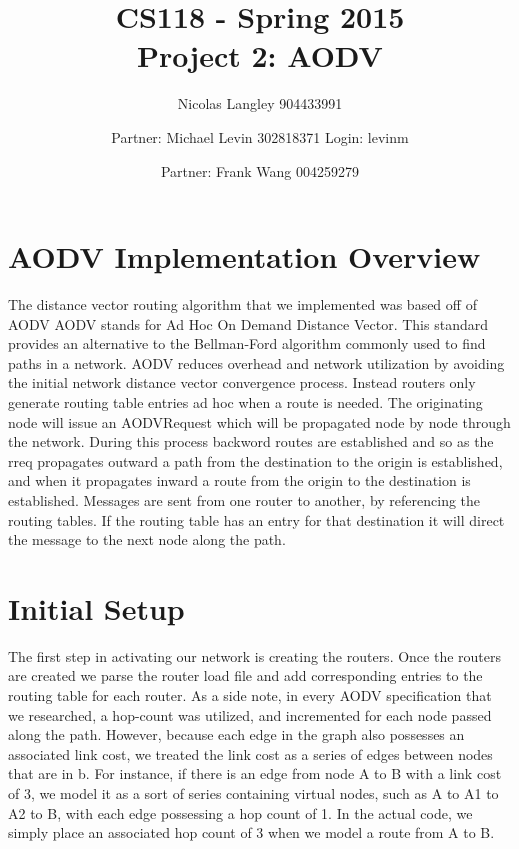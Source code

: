 \documentclass[12pt, titlepage]{article}
\begin{document}
\title{CS118 - Spring 2015 \\
Project 2: AODV}
\author{Nicolas Langley 904433991 \and Partner: Michael Levin 302818371 Login: levinm \and Partner: Frank Wang 004259279}

\maketitle
\section{AODV Implementation Overview}

The distance vector routing algorithm that we implemented was based off of AODV
AODV stands for Ad Hoc On Demand Distance Vector.
This standard provides an alternative to the Bellman-Ford algorithm commonly used to find paths in a network.
AODV reduces overhead and network utilization by avoiding the initial network distance vector convergence process.
Instead routers only generate routing table entries ad hoc when a route is needed.  The originating node will issue an AODVRequest which will be propagated node by node through the network. During this process backword routes are established and so as the rreq propagates outward a path from the destination to the origin is established, and when it propagates inward a route from the origin to the destination is established.  Messages are sent from one router to another, by referencing the routing tables.  If the routing table has an entry for that destination it will direct the message to the next node along the path.

\section{Initial Setup}
The first step in activating our network is creating the routers. Once the routers are created we parse the router load file and add corresponding entries to the routing table for each router. As a side note, in every AODV 
specification that we researched, a hop-count was utilized, and incremented for each node passed along the path. However, because each edge in the graph also possesses an associated link cost, we treated the link cost as a series of edges between nodes that are in b. For instance, if there is an edge from node A to B with a link cost of 3, we model it as a sort of series containing virtual nodes, such as A to A1 to A2 to B, with each edge possessing a hop count of 1. In the actual code, we simply place an associated hop count of 3 when we model a route from A to B. 
\end{document}
